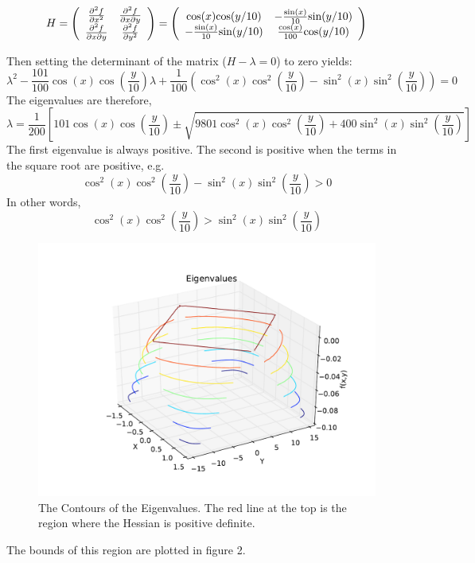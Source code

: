 \documentclass{article}
\begin{document}
\begin{equation*}
H = \left(
  \begin{array}{ c c }
     \frac{\partial^2 f}{\partial x^2} & \frac{\partial^2 f}{\partial x
      \partial y} \\
     \frac{\partial^2 f}{\partial x
      \partial y} & \frac{\partial^2 f}{\partial y^2}
  \end{array} \right)
= 
\left(
  \begin{array}{ c c }
     \text{cos}(x)\text{cos}(y/10) & -\frac{\text{sin}(x)}{10}\text{sin}(y/10) \\
     -\frac{\text{sin}(x)}{10}\text{sin}(y/10) & \frac{\text{cos}(x)}{100}\text{cos}(y/10)
  \end{array} \right)
\end{equation*}

Then setting the determinant of the matrix ($H - \lambda = 0$) to zero yields:
\begin{equation*}
		\lambda^2 - \frac{101}{100}\cos(x)\cos(\frac{y}{10})\lambda + \frac{1}{100}(\cos^2(x)\cos^2(\frac{y}{10}) - \sin^2(x)\sin^2(\frac{y}{10})) = 0
\end{equation*}
The eigenvalues are therefore,
\begin{equation*}
		\lambda = \frac{1}{200}\left[101\cos(x)\cos(\frac{y}{10}) \pm \sqrt{9801\cos^2(x)\cos^2(\frac{y}{10}) + 400\sin^2(x)\sin^2(\frac{y}{10})}\right]
\end{equation*}
The first eigenvalue is always positive. The second is positive when the
terms in the square root are positive, e.g. 
\begin{equation*}   
 \cos^2(x)\cos^2(\frac{y}{10}) - \sin^2(x)\sin^2(\frac{y}{10}) > 0
\end{equation*}
In other words,
\begin{equation*}
 \cos^2(x)\cos^2(\frac{y}{10}) > \sin^2(x)\sin^2(\frac{y}{10})
\end{equation*}

\begin{figure}[!htb]
  \includegraphics[scale=.5]{figs/eigen.pdf}
  \caption{The Contours of the Eigenvalues. The red line at the top is
 the region where the Hessian is positive definite. }   
\end{figure}
The bounds of this region are plotted in figure 2. 
\end{document}
